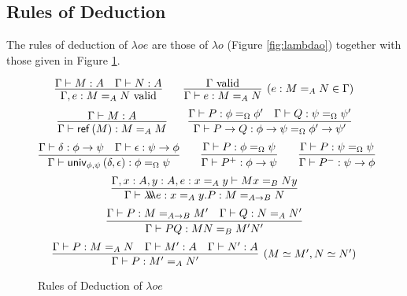
\subsection{Rules of Deduction}

The rules of deduction of $\lambda o e$ are those of $\lambda o$ (Figure \ref{fig:lambdao}) together with those given in Figure \ref{fig:lambdaoe}.

\begin{figure}
\begin{framed}
\[ \infer{\Gamma, e : M =_A N \vald}{\Gamma \vdash M : A \quad \Gamma \vdash N : A}
\qquad
\infer[(e : M =_A N \in \Gamma)]{\Gamma \vdash e : M =_A N}{\Gamma \vald} \]
\[ \infer{\Gamma \vdash \reff{M} : M =_A M}{\Gamma \vdash M : A}
\qquad
\infer{\Gamma \vdash P \rightarrow Q : \phi \rightarrow \psi =_\Omega \phi' \rightarrow \psi'}{\Gamma \vdash P : \phi =_\Omega \phi' \quad \Gamma \vdash Q : \psi =_\Omega \psi'} \]
\[ \infer{\Gamma \vdash \univ{\phi}{\psi}{\delta}{\epsilon} : \phi =_\Omega \psi}{\Gamma \vdash \delta : \phi \rightarrow \psi \quad \Gamma \vdash \epsilon : \psi \rightarrow \phi} 
\qquad
\infer{\Gamma \vdash P^+ : \phi \rightarrow \psi}{\Gamma \vdash P : \phi =_\Omega \psi}
\qquad
\infer{\Gamma \vdash P^- : \psi \rightarrow \phi}{\Gamma \vdash P : \psi =_\Omega \psi} \]
\[ \infer{\Gamma \vdash \triplelambda e : x =_A y . P : M =_{A \rightarrow B} N}{\Gamma, x : A, y : A, e : x =_A y \vdash M x =_B N y} \]
\[ \infer{\Gamma \vdash PQ : MN =_B M' N'}{\Gamma \vdash P : M =_{A \rightarrow B} M' \quad \Gamma \vdash Q : N =_A N'} \]
\[ \infer[(M \simeq M', N \simeq N')]{\Gamma \vdash P : M' =_A N'}{\Gamma \vdash P : M =_A N \quad \Gamma \vdash M' : A \quad \Gamma \vdash N' : A} \]
\end{framed}
\caption{Rules of Deduction of $\lambda oe$}
\label{fig:lambdaoe}
\end{figure}

